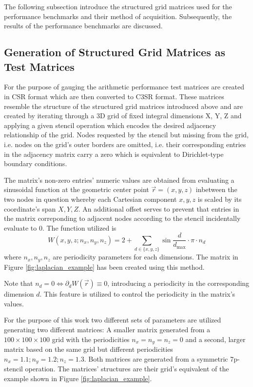 \documentclass{article}
\begin{document}
  The following subsection introduce the structured grid matrices used for the performance benchmarks and their method of acquisition. Subsequently, the results of the performance benchmarks are discussed.

  \subsection{Generation of Structured Grid Matrices as Test Matrices}

    For the purpose of gauging the arithmetic performance test matrices are created in CSR format which are then converted to C3SR format. These matrices resemble the structure of the structured grid matrices introduced above and are created by iterating through a 3D grid of fixed integral dimensions X, Y, Z and applying a given stencil operation which encodes the desired adjacency relationship of the grid. Nodes requested by the stencil but missing from the grid, i.e.  nodes on the grid's outer borders are omitted, i.e. their corresponding entries in the adjacency matrix carry a zero which is equivalent to Dirichlet-type boundary conditions.

    The matrix's non-zero entries' numeric values are obtained from evaluating a sinusoidal function at the geometric center point $\vec{r} = (x, y, z)$ inbetween the two nodes in question whereby each Cartesian component $x, y, z$ is scaled by its coordinate's span $X, Y, Z$. An additional offset serves to prevent that entries in the matrix correponding to adjacent nodes according to the stencil incidentally evaluate to 0. The function utilized is $$W(x,y,z; n_x, n_y, n_z) = 2 + \sum \limits_{d \in \{x,y,z\}} \sin{\frac{d}{d_{\text{max}}} \cdot \pi \cdot n_d} $$ where $n_x, n_y, n_z$ are periodicity parameters for each dimensions. The matrix in Figure \ref{fig:laplacian_example} has been created using this method.

    Note that $n_d = 0 \Leftrightarrow \partial_d W(\vec{r}) \equiv 0$, introducing a periodicity in the corresponding dimension $d$. This feature is utilized to control the periodicity in the matrix's values.

    For the purpose of this work two different sets of parameters are utilized generating two different matrices: A smaller matrix generated from a $100 \times 100 \times 100$ grid with the periodicities $n_x = n_y = n_z = 0$ and a second, larger matrix based on the same grid but different periodicities $n_x = 1.1; n_y = 1.2; n_z = 1.3$. Both matrices are generated from a symmetric 7p-stencil operation. The matrices' structures are their grid's equivalent of the example shown in Figure \ref{fig:laplacian_example}.
\end{document}
